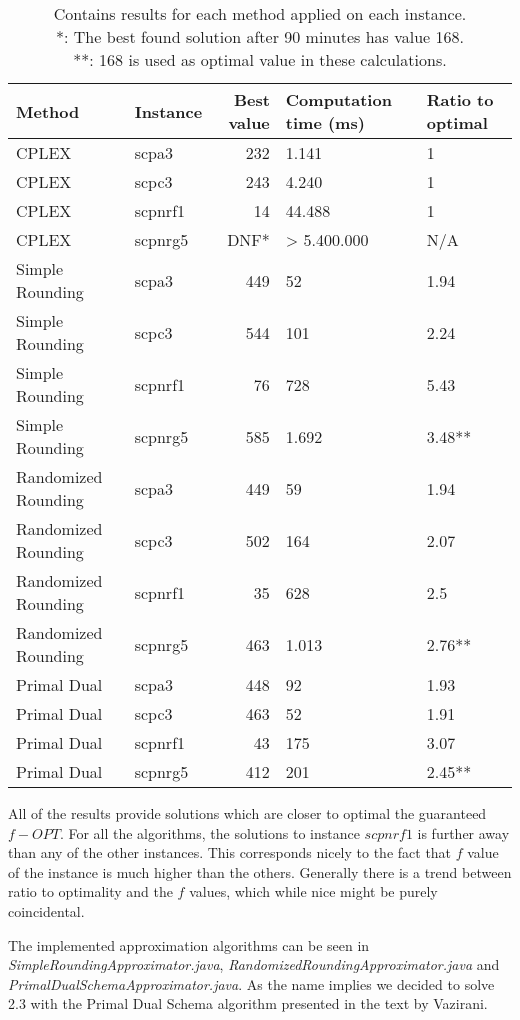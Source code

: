 \begin{table}[H]
	\begin{tabularx}{\linewidth}{|X|l|r|X|X|}
		\hline
		\textbf{Method} & \textbf{Instance} & \textbf{Best value} & \textbf{Computation time (ms)} & \textbf{Ratio to optimal}\\\hline
		CPLEX & scpa3 & 232 & 1.141 & 1\\\hline
		CPLEX & scpc3 & 243 & 4.240 & 1\\\hline
		CPLEX & scpnrf1 & 14 & 44.488 & 1\\\hline
		CPLEX & scpnrg5 & DNF* & > 5.400.000 & N/A\\\hline\hline
		Simple Rounding & scpa3 & 449 & 52 & 1.94\\\hline
		Simple Rounding & scpc3 & 544 & 101 & 2.24\\\hline
		Simple Rounding & scpnrf1 & 76 & 728 & 5.43\\\hline
		Simple Rounding & scpnrg5 & 585 & 1.692 & 3.48**\\\hline\hline
		Randomized Rounding & scpa3 & 449 & 59 & 1.94\\\hline
		Randomized Rounding & scpc3 & 502 & 164 & 2.07\\\hline
		Randomized Rounding & scpnrf1 & 35 & 628 & 2.5\\\hline
		Randomized Rounding & scpnrg5 & 463 & 1.013 & 2.76**\\\hline\hline
		Primal Dual & scpa3 & 448 & 92 & 1.93\\\hline
		Primal Dual & scpc3 & 463 & 52 & 1.91\\\hline
		Primal Dual & scpnrf1 & 43 & 175 & 3.07\\\hline
		Primal Dual & scpnrg5 & 412 & 201 & 2.45**\\\hline
	\end{tabularx}
	\caption{Contains results for each method applied on each instance.\\ *: The best found solution after 90 minutes has value 168.\\ **: 168 is used as optimal value in these calculations.}
\end{table}

All of the results provide solutions which are closer to optimal the guaranteed $f-OPT$. For all the algorithms, the solutions to instance $scpnrf1$ is further away than any of the other instances. This corresponds nicely to the fact that $f$ value of the instance is much higher than the others. Generally there is a trend between ratio to optimality and the $f$ values, which while nice might be purely coincidental.

\noindent
The implemented approximation algorithms can be seen in \textit{SimpleRoundingApproximator.java}, \textit{RandomizedRoundingApproximator.java} and \textit{PrimalDualSchemaApproximator.java}. As the name implies we decided to solve 2.3 with the Primal Dual Schema algorithm presented in the text by Vazirani.
